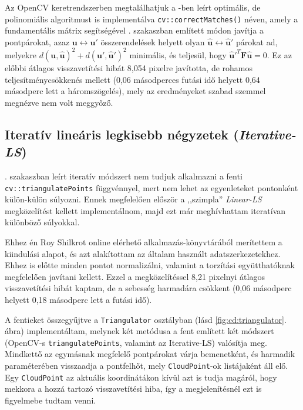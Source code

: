 Az OpenCV keretrendszerben megtalálhatjuk a \cite{hartley-triangulation}-ben leírt optimális, de polinomiális algoritmust is implementálva \texttt{cv::correctMatches()} néven, amely a fundamentális mátrix segítségével . szakaszban említett módon javítja a pontpárokat, azaz $\mathbf{u} \leftrightarrow \mathbf{u}'$ összerendelések helyett olyan $\mathbf{\hat{u}} \leftrightarrow \mathbf{\hat{u}}'$ párokat ad, melyekre $d(\mathbf{u}, \mathbf{\hat{u}})^2 + d(\mathbf{u}', \mathbf{\hat{u}}')^2$ minimális, és teljesül, hogy $\mathbf{\hat{u}}'^T \mathbf{F} \mathbf{\hat{u}} = 0$. Ez az előbbi átlagos visszavetítési hibát 8,054 pixelre javította, de rohamos teljesítménycsökkenés mellett (0,06 másodperces futási idő helyett 0,64 másodperc lett a háromszögelés), mely az eredményeket szabad szemmel megnézve nem volt meggyőző.


\subsection{Iteratív lineáris legkisebb négyzetek (\textit{Iterative-LS})}

. szakaszban leírt iteratív módszert nem tudjuk alkalmazni a fenti \texttt{cv::triangulatePoints} függvénnyel, mert nem lehet az egyenleteket pontonként külön-külön súlyozni. Ennek megfelelően először a ,,szimpla'' \textit{Linear-LS} megközelítést kellett implementálnom, majd ezt már meghívhattam iteratívan különböző súlyokkal.

Ehhez én Roy Shilkrot online elérhető alkalmazás-könyvtárából \cite{sfm-toy-library} merítettem a kiindulási alapot, és azt alakítottam az általam használt adatszerkezetekhez. Ehhez is előtte minden pontot normalizálni, valamint a torzítási együtthatóknak megfelelően javítani kellett. Ezzel a megközelítéssel 8,21 pixelnyi átlagos visszavetítési hibát kaptam, de a sebesség harmadára csökkent (0,06 másodperc helyett 0,18 másodperc lett a futási idő). %

A fentieket összegyűjtve a \texttt{Triangulator} osztályban (lásd \ref{fig:cd:triangulator}. ábra) implementáltam, melynek két metódusa a fent említett két módszert (OpenCV-s \texttt{triangulatePoints}, valamint az Iterative-LS) valósítja meg. Mindkettő az egymásnak megfelelő pontpárokat várja bemenetként, és harmadik paraméterében visszaadja a pontfelhőt, mely \texttt{CloudPoint}-ok listájaként áll elő. Egy \texttt{CloudPoint} az aktuális koordinátákon kívül azt is tudja magáról, hogy mekkora a hozzá tartozó visszavetítési hiba, így a megjelenítésnél ezt is figyelmebe tudtam venni.

